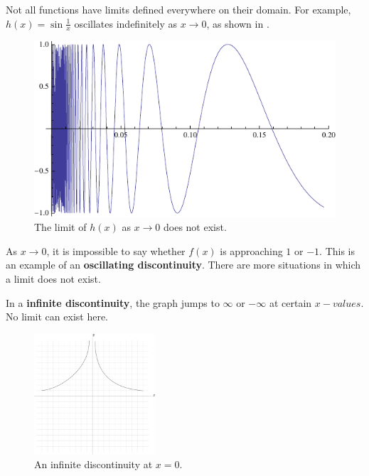 Not all functions have limits defined everywhere on their domain.
For example, $h(x)=\sin \frac{1}{x}$ oscillates indefinitely as \(x \to 0\), as shown in .
\begin{figure}[H]
  \begin{center}
    \includegraphics{graphs/p1sin1x.pdf}
  \end{center}
  \caption{The limit of \(h(x)\) as \(x \to 0\) does not exist.}
  \label{fig:p1sin1x}
\end{figure}
As \(x\to0\), it is impossible to say whether \(f(x)\) is approaching \(1\) or \(-1\).
This is an example of an \textbf{oscillating discontinuity}.
There are more situations in which a limit does not exist.

In a \textbf{infinite discontinuity}, the graph jumps to $\infty$ or $-\infty$ at certain $x-values$.
No limit can exist here.
\begin{figure}[H]
  \begin{center}
    \includegraphics[width=0.4\textwidth]{continuous/limits/infinited}
  \end{center}
  \caption{An infinite discontinuity at $x=0$.}
\end{figure}


